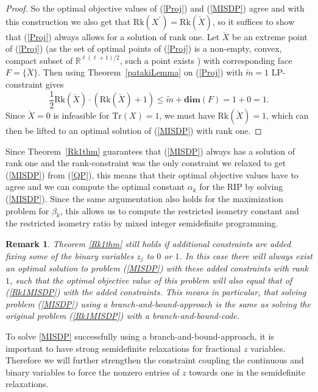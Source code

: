 \documentclass[journal]{IEEEtran}
\newtheorem{remark}{Remark}
\newcommand{\Tr}{\text{Tr}}
\newcommand{\Rk}{\text{Rk}}
\newcommand{\R}{\mathds{R}}
\begin{document}
\begin{proof}
So the optimal objective values of (\ref{Proj}) and (\ref{MISDP}) agree and with this construction we also get that 
$\Rk(X^{\prime}) = \Rk(\check{X})$, so it suffices to show that (\ref{Proj}) always allows for a solution of rank one.
Let $\breve{X}$ be an extreme point of (\ref{Proj}) (as the set of optimal points of (\ref{Proj}) is a non-empty, convex, compact subset of $\R^{\ell(\ell+1)/2}$, such a point exists
\cite[Corollary 18.5.1]{Roc70}) with corresponding face $F=\{\breve{X}\}$. Then using Theorem~\ref{patakiLemma} on (\ref{Proj}) with $\tilde{m} = 1$ LP-constraint gives
\begin{equation*}
 \frac{1}{2}\Rk(\breve{X})\cdot(\Rk(\breve{X})+1) \leq \tilde{m} + \textbf{dim}(F) = 1 + 0 = 1.
\end{equation*}
Since $\breve{X}=0$ is infeasible for $\Tr(X)=1$, we must have $\Rk(\breve{X}) = 1$, which can then be lifted to an optimal solution of (\ref{MISDP}) with rank one.
\end{proof}

Since Theorem~\ref{Rk1thm} guarantees that (\ref{MISDP}) always has a solution of rank one and the rank-constraint was the only constraint we relaxed to get (\ref{MISDP}) from (\ref{QP}), this means that their optimal objective values 
have to agree and we can compute the optimal constant $\alpha_k$ for the RIP by solving (\ref{MISDP}). Since the same argumentation also holds for the maximization problem for $\beta_k$, this allows us to compute the restricted isometry
constant and the restricted isometry ratio by mixed integer semidefinite programming.

\begin{remark}\label{Rk1rmk}
Theorem \ref{Rk1thm} still holds if additional constraints are added fixing some of the binary variables $z_j$ to $0$ or $1$. In this case there will always exist an optimal solution to problem (\ref{MISDP}) with these added
constraints with rank $1$, such that the optimal objective value of this problem will also equal that of (\ref{Rk1MISDP}) with the added constraints. This means in particular, that solving problem (\ref{MISDP}) using a 
branch-and-bound-approach is the same as solving the original problem (\ref{Rk1MISDP}) with a branch-and-bound-code.
\end{remark}

To solve \eqref{MISDP} successfully using a branch-and-bound-approach, it is important to have strong semidefinite relaxations for fractional $z$ variables. 
Therefore we will further strengthen the constraint coupling the continuous and binary variables to force the nonzero entries of $z$ towards one in the
semidefinite relaxations.
\end{document}

